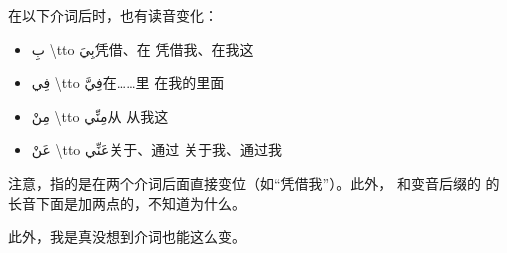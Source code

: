 在以下介词后时，也有读音变化：

\begin{itemize}
    \item \ac{بِ \tto بِيَ}{凭借、在 \tto 凭借我、在我这}
    \item \ac{فِي \tto فِيَّ}{在……里 \tto 在我的里面}
    \item \ac{مِنْ \tto مِنِّي}{从 \tto 从我这}
    \item \ac{عَنْ \tto عَنِّي}{关于、通过 \tto 关于我、通过我}
\end{itemize}

\begin{note}
    注意，指的是在两个介词后面直接变位（如``凭借我''）。此外， 和变音后缀的  的长音下面是加两点的，不知道为什么。

    此外，我是真没想到介词也能这么变。
\end{note}
